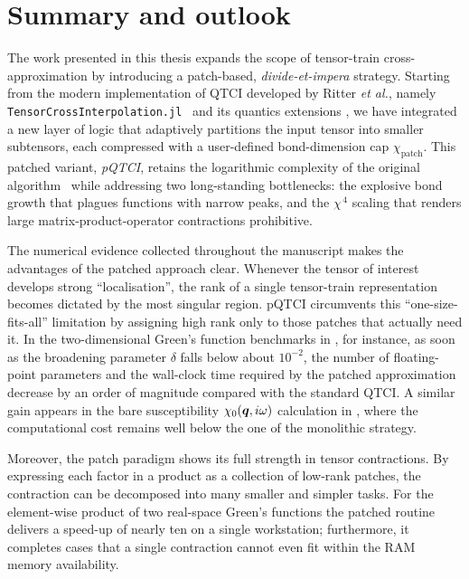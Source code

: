 \chapter{Summary and outlook}
\label{chap:concl}

The work presented in this thesis expands the scope of tensor-train cross-approximation by introducing a patch-based, \textit{divide-et-impera} strategy.
Starting from the modern implementation of QTCI developed by Ritter \textit{et al.}, namely \texttt{TensorCrossInterpolation.jl}~\cite{TensorCrossInterpolation.jl} and
its quantics extensions \cite{tensor4all.org}, we have integrated a new layer of logic that adaptively partitions the input tensor into smaller subtensors, each compressed with a user-defined bond-dimension cap \(\chi_{\text{patch}}\).  This patched variant, \textit{pQTCI}, retains the logarithmic complexity of the original algorithm~\cite{Fernandez2024} while
addressing two long-standing bottlenecks: the explosive bond growth that plagues functions with narrow peaks, and the \(\chi^{\,4}\) scaling that renders large matrix-product-operator contractions prohibitive.

The numerical evidence collected throughout the manuscript makes the advantages of the patched approach clear. Whenever the tensor of interest develops strong ``localisation'', the rank of a single tensor-train representation becomes dictated by the most singular region.  pQTCI circumvents this ``one-size-fits-all'' limitation by assigning high rank only to those patches that actually need it.  In the two-dimensional Green's function benchmarks in , for instance, as soon as the broadening parameter $\delta$ falls below about \(10^{-2}\), the number of floating-point parameters and the wall-clock time required by the patched approximation decrease by an order of magnitude compared with the standard QTCI. A similar gain appears in the bare susceptibility $\chi_0(\boldsymbol{q},i\omega)$ calculation in , where the computational cost remains well below the one of the monolithic strategy.

Moreover, the patch paradigm shows its full strength in tensor contractions.  By expressing each factor in a product as a collection of low-rank patches, the contraction can be decomposed into many smaller and simpler tasks. For the element-wise product of two real-space Green's functions the patched routine delivers a speed-up of nearly ten on a single workstation; furthermore, it completes cases that a single contraction cannot even fit within the RAM memory availability.

